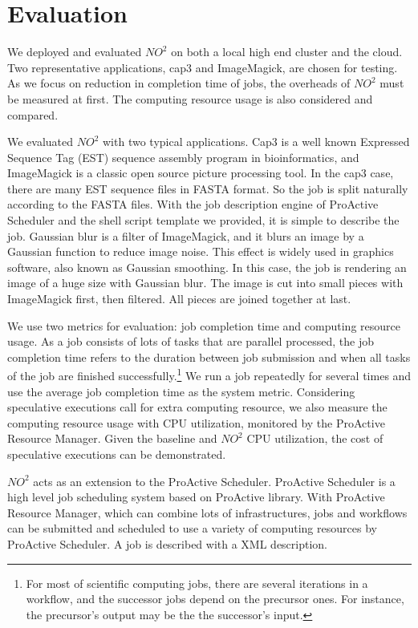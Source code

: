 \section{Evaluation}
We deployed and evaluated $NO^2$ on both a local high end cluster and the cloud. Two representative applications, cap3 and ImageMagick, are chosen for testing. As we focus on reduction in completion time of jobs, the overheads of $NO^2$ must be measured at first. The computing resource usage is also considered and compared.

We evaluated $NO^2$ with two typical applications. Cap3 is a well known Expressed Sequence Tag (EST) sequence assembly program in bioinformatics, and ImageMagick is a classic open source picture processing tool. In the cap3 case, there are many EST sequence files in FASTA format. So the job is split naturally according to the FASTA files. With the job description engine of ProActive Scheduler and the shell script template we provided, it is simple to describe the job. Gaussian blur is a filter of ImageMagick, and it blurs an image by a Gaussian function to reduce image noise. This effect is widely used in graphics software, also known as Gaussian smoothing. In this case, the job is rendering an image of a huge size with Gaussian blur. The image is cut into small pieces with ImageMagick first, then filtered. All pieces are joined together at last.

We use two metrics for evaluation: job completion time and computing resource usage. As a job consists of lots of tasks that are parallel processed, the job completion time refers to the duration between job submission and when all tasks of the job are finished successfully.\footnote{For most of scientific computing jobs, there are several iterations in a workflow, and the successor jobs depend on the precursor ones. For instance, the precursor's output may be the the successor's input.} We run a job repeatedly for several times and use the average job completion time as the system metric. Considering speculative executions call for extra computing resource, we also measure the computing resource usage with CPU utilization, monitored by the ProActive Resource Manager. Given the baseline and $NO^2$ CPU utilization, the cost of speculative executions can be demonstrated.

$NO^2$ acts as an extension to the ProActive Scheduler. ProActive Scheduler is a high level job scheduling system based on ProActive library. With ProActive Resource Manager, which can combine lots of infrastructures, jobs and workflows can be submitted and scheduled to use a variety of computing resources by ProActive Scheduler. A job is described with a XML description.

